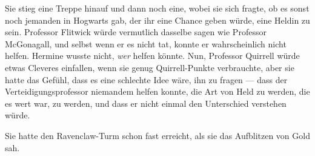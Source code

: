 Sie stieg eine Treppe hinauf und dann noch eine, wobei sie sich fragte, ob es sonst noch jemanden in Hogwarts gab, der ihr eine Chance geben würde, eine Heldin zu sein. Professor Flitwick würde vermutlich dasselbe sagen wie Professor McGonagall, und selbst wenn er es nicht tat, konnte er wahrscheinlich nicht helfen. Hermine wusste nicht, \emph{wer} helfen könnte. Nun, Professor Quirrell würde etwas Cleveres einfallen, wenn sie genug Quirrell-Punkte verbrauchte, aber sie hatte das Gefühl, dass es eine schlechte Idee wäre, ihn zu fragen — dass der Verteidigungsprofessor niemandem helfen konnte, die Art von Held zu werden, die es wert war, zu werden, und dass er nicht einmal den Unterschied verstehen würde.

Sie hatte den Ravenclaw-Turm schon fast erreicht, als sie das Aufblitzen von Gold sah.


